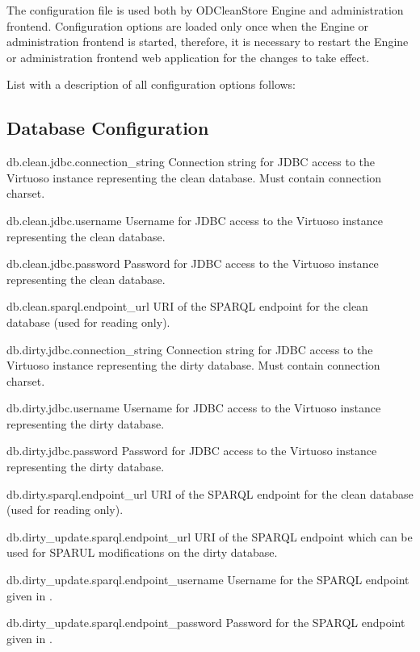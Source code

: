 The configuration file is used both by ODCleanStore Engine and administration frontend. Configuration options are loaded only once when the Engine or administration frontend is started, therefore, it is necessary to restart the Engine or administration frontend web application for the changes to take effect.

List with a description of all configuration options follows:

\subsection*{Database Configuration}
\begin{configlist}
	\item[db.clean.jdbc.connection\_string]
	  Connection string for JDBC access to the Virtuoso instance representing the clean database. Must contain connection charset.
	\item[db.clean.jdbc.username]
	  Username for JDBC access to the Virtuoso instance representing the clean database.
	\item[db.clean.jdbc.password]
	  Password for JDBC access to the Virtuoso instance representing the clean database.
	\item[db.clean.sparql.endpoint\_url]
		URI of the SPARQL endpoint for the clean database (used for reading only).
	\item[db.dirty.jdbc.connection\_string]
		 Connection string for JDBC access to the Virtuoso instance representing the dirty database. Must contain connection charset.
	\item[db.dirty.jdbc.username]
		Username for JDBC access to the Virtuoso instance representing the dirty database.
	\item[db.dirty.jdbc.password]
		Password for JDBC access to the Virtuoso instance representing the dirty  database.
	\item[db.dirty.sparql.endpoint\_url]
		URI of the SPARQL endpoint for the clean database (used for reading only).
	\item[db.dirty\_update.sparql.endpoint\_url]
		URI of the SPARQL endpoint which can be used for SPARUL modifications on the dirty database.
	\item[db.dirty\_update.sparql.endpoint\_username]
		Username for the SPARQL endpoint given in .
	\item[db.dirty\_update.sparql.endpoint\_password]
		Password for the SPARQL endpoint given in .
\end{configlist}

